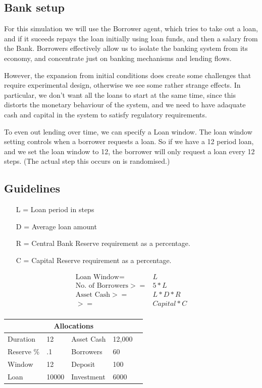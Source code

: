\documentclass{article}
\begin{document}
\subsection*{Bank setup}
For this simulation we will use the Borrower agent, which tries to take
out a loan, and if it suceeds repays the loan initially using loan funds,
and then a salary from the Bank. Borrowers effectively allow us
to isolate the banking system from its economy, and concentrate just
on banking mechanisms and lending flows.

However, the expansion from initial conditions does create some
challenges that require experimental design, otherwise we see
some rather strange effects. In particular, we
don't want all the loans to start at the same time, since this 
distorts the monetary behaviour of the system, and we need
to have adaquate cash and capital in the system to satisfy
regulatory requirements.

To even out lending over time, we can specify a Loan window.
The loan window setting controls when a borrower requests a loan.
So if we have a 12 period loan, and we set the loan window to 12,
the borrower will only request a loan every 12 steps. (The actual
step this occurs on is randomised.)

\subsection*{Guidelines}
\begin{itemize}
\setlength\itemsep{-0.5em}
\item[L =] Loan period in steps
\item[D =] Average loan amount
\item[R =] Central Bank Reserve requirement as a percentage.
\item[C =] Capital Reserve requirement as a percentage.
\end{itemize}

\begin{align*}
\text{Loan Window}  =& L \\[-0.5ex]
\text{No. of Borrowers} >=& 5*L \\[-0.5ex]
\text{Asset Cash} >=& L * D * R  \\[-0.5ex]
                  >=& Capital * C\\[-0.5ex]
\end{align*}

\begin{table}[h]
\centering
\begin{tabular}{lllll}
\multicolumn{5}{c}{Allocations} \\
\hline
Duration   & 12    & Asset Cash  & 12,000 &  \\
Reserve \% & .1    & Borrowers   &  60    &  \\
Window     & 12    & Deposit     &  100   &  \\
Loan       & 10000 & Investment  &  6000  &  \\
\end{tabular}
\end{table}
\end{document}
